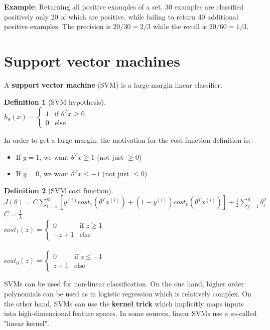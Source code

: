 \documentclass{report}
\newtheorem{definition}{Definition}[section]
\begin{document}
{\bf Example}: Returning all positive examples of a set. 30 examples are classified positively only 20 of which are positive, while failing to return 40 additional positive examples. The precision is $20/30 = 2/3$ while the recall is $20/60 = 1/3$.

\section{Support vector machines}
A {\bf support vector machine} (SVM) is a large margin linear classifier.
\begin{definition}[SVM hypothesis]~\\
$h_{\theta}(x) =
\left\{
\begin{array}{lll}
1  & \mbox{if } \theta^Tx \ge 0 \\
0  & \mbox{else}
\end{array}
\right.$ \\
\end{definition}

In order to get a large margin, the motivation for the cost function definition is:
\begin{itemize}
\item If $y=1$, we want $\theta^Tx\ge 1$ (not just $\ge 0$)
\item If $y=0$, we want $\theta^Tx\le -1$ (not just $\le 0$)
\end{itemize}

\begin{definition}[SVM cost function]~\\
$J(\theta)=C\sum_{i=1}^m[y^{(i)}cost_1(\theta^Tx^{(i)})+(1-y^{(i)})cost_0(\theta^Tx^{(i)})]+\frac{1}{2}\sum_{j=1}^n\theta_j^2$
\\
$C = \frac{1}{\lambda}$
\\
$cost_1(z)=
\left\{
\begin{array}{lll}
0  & \mbox{if } z \ge 1 \\
-z + 1  & \mbox{else}
\end{array}
\right.$ \\
\\
$cost_0(z)=
\left\{
\begin{array}{lll}
0  & \mbox{if } z \le -1 \\
z + 1  & \mbox{else}
\end{array}
\right.$ \\
\end{definition}

SVMs can be used for non-linear classification. On the one hand, higher order polynomials can be used as in logistic regression which is relatively complex. On the other hand, SVMs can use the {\bf kernel trick} which implicitly maps inputs into high-dimensional feature spaces. In some sources, linear SVMs use a so-called "linear kernel".
\end{document}
